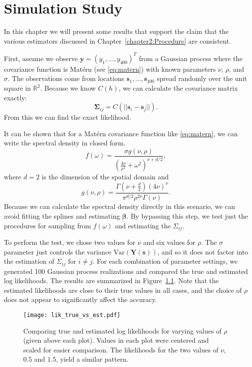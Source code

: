 \chapter{Simulation Study} \label{chapter3:Simulation-Study}

In this chapter we will present some results that support the claim that the various estimators discussed in Chapter~\ref{chapter2:Procedure} are consistent.

First, assume we observe $\bm{y} = (y_1, \dots, y_{400})^T$ from a Gaussian process where the covariance function is Mat\'{e}rn (see \eqref{eq:matern}) with known parameters $\nu$, $\rho$, and $\sigma$. The observations come from locations $\bm{s}_1, \dots, \bm{s}_{400}$ spread randomly over the unit square in $\mathbb{R}^2$. Because we know $C(h)$, we can calculate the covariance matrix exactly:
\[
	\bm{\Sigma}_{ij} = C(||\bm{s}_i - \bm{s}_j||).
\]
From this we can find the exact likelihood.

It can be shown that for a Mat\'{e}rn covariance function like \eqref{eq:matern}, we can write the spectral density in closed form.
\[
	f(\omega) = \frac{\sigma g(\nu, \rho)}{\left( \frac{4\nu}{\rho^2} + \omega^2 \right)^{\nu+d/2}},
\]
where $d = 2$ is the dimension of the spatial domain and
\[
	g(\nu, \rho) = \frac{\Gamma\left(\nu + \frac{d}{2}\right)(4\nu)^\nu}{\pi^{d/2} \rho^{2\nu} \Gamma(\nu)}.
\]
Because we can calculate the spectral density directly in this scenario, we can avoid fitting the splines and estimating $\bm{\beta}$. By bypassing this step, we test just the procedures for sampling from $f(\omega)$ and estimating the $\Sigma_{ij}$.

To perform the test, we chose two values for $\nu$ and six values for $\rho$. The $\sigma$ parameter just controls the variance $\textrm{Var}(\bm{Y}(\bm{s}))$, and so it does not factor into the estimation of $\Sigma_{ij}$ for $i \neq j$. For each combination of parameter settings, we generated 100 Gaussian process realizations and compared the true and estimated log likelihoods. The results are summarized in Figure~\ref{fig:liks_by_rho}. Note that the estimated likelihoods are close to their true values in all cases, and the choice of $\rho$ does not appear to significantly affect the accuracy.

\begin{figure}[!htb]
	\centering
	\texttt{[image: lik\_true\_vs\_est.pdf]}
	\caption{\small Comparing true and estimated log likelihoods for varying values of $\rho$ (given above each plot). Values in each plot were centered and scaled for easier comparison. The likelihoods for the two values of $\nu$, $0.5$ and $1.5$, yield a similar pattern.}
	\label{fig:liks_by_rho}
\end{figure}

